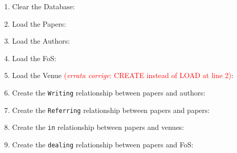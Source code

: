 \documentclass{Configuration_Files/PoliMi3i_thesis}
\begin{document}
\begin{enumerate}
    \item Clear the Database: 
    \item Load the Papers: 
    \item Load the Authors: 
    \item Load the FoS: 
    \item Load the Venue \textcolor{red}{(\textit{errata corrige}: CREATE instead of LOAD at line 2)}: 
    \item Create the \verb |Writing|  relationship between papers and authors:
    \item Create the \verb |Referring| relationship between papers and papers:
    \item Create the \verb |in| relationship between papers and venues:
    \item Create the \verb |dealing| relationship between papers and FoS:
\end{enumerate}
\newpage
\end{document}

